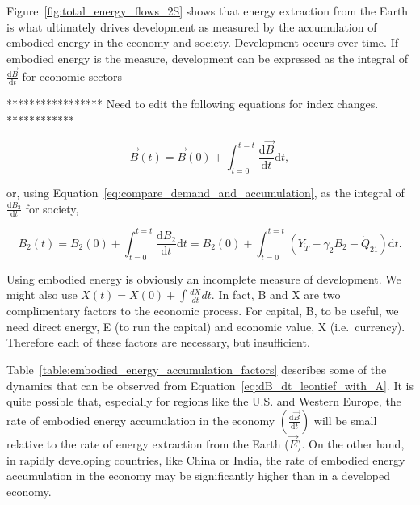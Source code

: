 Figure~\ref{fig:total_energy_flows_2S} shows that energy extraction 
from the Earth is what ultimately drives development 
as measured by the accumulation of embodied energy in the economy and society. 
Development occurs over time. 
If embodied energy is the measure, 
development can be expressed as 
the integral of $\frac{\mathrm{d}\vec{B}}{\mathrm{d}t}$ for economic sectors

***************** Need to edit the following equations for index changes. ************

\begin{equation} \label{eq:Dev_Integral_Economy}
	\vec{B}(t) 
	= \vec{B}(0) 
	+ \int_{t=0}^{t=t} \frac{\mathrm{d}\vec{B}}{\mathrm{d}t}\mathrm{d}t,
\end{equation}

\noindent{}or, using Equation~\ref{eq:compare_demand_and_accumulation}, 
as the integral of $\frac{\mathrm{d}B_{2}}{\mathrm{d}t}$ for society,

\begin{equation} \label{eq:Dev_Integral_Society}
	B_{2}(t) 
	= B_{2}(0) 
	+ \int_{t=0}^{t=t} \frac{\mathrm{d}B_{2}}{\mathrm{d}t}\mathrm{d}t 
	= B_{2}(0) 
	+ \int_{t=0}^{t=t} (Y_{\dot{T}} 
	- \gamma_{2}B_{2} 
	- \dot{Q}_{21})\mathrm{d}t.
\end{equation}


Using embodied energy is obviously an incomplete measure of development. 
We might also use $X(t) = X(0) + \int\frac{dX}{dt}dt$. 
In fact, B and X are two complimentary factors to the economic process. 
For capital, B, to be useful, we need direct energy, 
E (to run the capital) and economic value, X (i.e.\ currency). 
Therefore each of these factors are necessary, but insufficient.

Table~\ref{table:embodied_energy_accumulation_factors} 
describes some of the dynamics that can be observed from 
Equation~\ref{eq:dB_dt_leontief_with_A}. 
It is quite possible that, especially for regions like the U.S. and Western Europe, 
the rate of embodied energy accumulation in the economy 
$\left(\frac{\mathrm{d}\vec{B}}{\mathrm{d}t}\right)$ 
will be small relative to the rate of energy extraction 
from the Earth ($\vec{E}$). 
On the other hand, in rapidly developing countries, 
like China or India, the rate of embodied energy accumulation 
in the economy may be significantly higher than in a developed economy.

